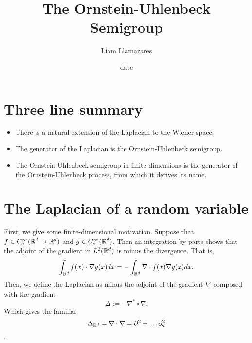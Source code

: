 \documentclass[12pt]{article}
\begin{document}
\begin{CJK*}{UTF8}{gbsn}
	\title{The Ornstein-Uhlenbeck Semigroup}
	\author{Liam Llamazares}
	\date{date}
	\maketitle
	\section{ Three line summary}
	\begin{itemize}
		\item There is a natural extension of the Laplacian to the Wiener space.
		\item The generator of the Laplacian is the Ornstein-Uhlenbeck semigroup.
		\item The Ornstein-Uhlenbeck semigroup in finite dimensions is the generator of the Ornstein-Uhlenbeck process, from which it derives its name.	\end{itemize}
	\section{The Laplacian of a random variable}
	First, we give some finite-dimensional motivation. Suppose that $f\in C_c^\infty({\mathbb R}^d\to{\mathbb R}^d)$ and $g\in C_c^\infty({\mathbb R}^d)$. Then an integration by parts shows that the adjoint of the gradient
	in $L^2({\mathbb R}^d)$ is minus the divergence. That is,
	\begin{equation*}
		\int_{{\mathbb R}^d}f(x) \cdot \nabla g(x) dx=-\int_{{\mathbb R}^d}\nabla\cdot  f(x) \nabla g(x) dx.
	\end{equation*}
	Then, we define the Laplacian as minus the adjoint of the gradient $\nabla$ composed with the gradient
	\begin{equation*}
		\Delta := -\nabla^*\circ \nabla .
	\end{equation*}
	Which gives the familiar $$\Delta_{{\mathbb R}^d} =\nabla\cdot \nabla=\partial_1^2+\ldots\partial _d^2$$.


\end{CJK*}
\end{document}
